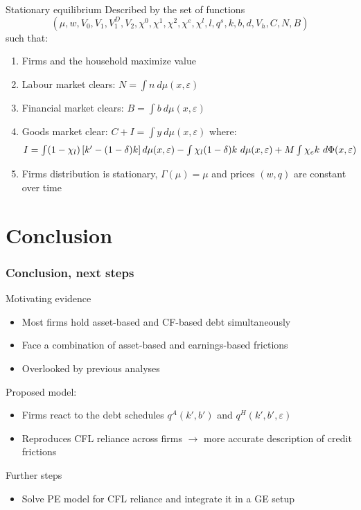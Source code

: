 \documentclass[notes]{beamer}
\begin{document}
\begin{frame}[label=market clearing]{Stationary equilibrium}
Described by the set of functions  
$$(\mu, w, V_0, V_1, V_1^D, V_2, \chi^0, \chi^1, \chi^2,  \chi^e,  \chi^l, l,q^s,k,b,d, V_h, C, N, B)$$
such that: 
\begin{enumerate}[i]
\item Firms and the household maximize value 
\item Labour market clears: 
$ N = \int n  \ d \mu (x,\varepsilon)  $
\item Financial market clears:
$ B = \int b \ d \mu (x,\varepsilon) $
\item Goods market clear: 
$ C + I = \int y \ d \mu (x,\varepsilon)$
where: 
\begin{equation*}
    \resizebox{1\hsize}{!}{$
    I = \int (1-\chi_l)\left[ k' -(1-\delta)k \right] d \mu (x,\varepsilon) - \int \chi_l (1-\delta) k \ d \mu (x,\varepsilon)  + M \int \chi_e k \ d \Phi(x,\varepsilon) 
    $}
\end{equation*}
\item Firms distribution is stationary, $\Gamma(\mu) = \mu$ and prices $(w,q)$ are constant over time
\end{enumerate}

\end{frame}

\section{Conclusion}

\begin{frame}[label=concl] 
\frametitle{Conclusion, next steps}
Motivating evidence
\begin{itemize} \setlength\itemsep{0em}
    \item Most firms hold asset-based and CF-based debt simultaneously
    \item Face a combination of asset-based and earnings-based frictions
    \item Overlooked by previous analyses
\end{itemize}
Proposed model: 
\begin{itemize} \setlength\itemsep{0em}
    \item Firms react to the debt schedules $q^A(k',b')$ and $q^H(k',b',\varepsilon)$
    \item Reproduces CFL reliance across firms $\rightarrow$ more accurate description of credit frictions
\end{itemize}
Further steps
\begin{itemize} \setlength\itemsep{0em}
    \item Solve PE model for CFL reliance and integrate it in a GE setup
\end{itemize}

\end{frame}
\end{document}
